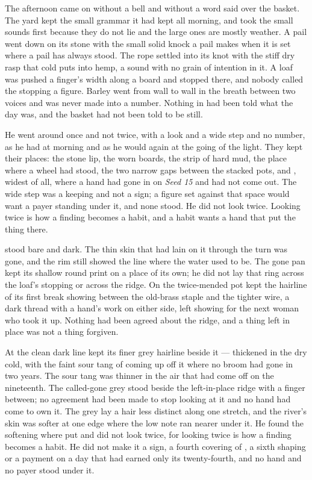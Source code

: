 The afternoon came on without a bell and without a word said over the basket. The yard kept the small grammar it had kept all morning, and  took the small sounds first because they do not lie and the large ones are mostly weather. A pail went down on its stone with the small solid knock a pail makes when it is set where a pail has always stood. The rope settled into its knot with the stiff dry rasp that cold puts into hemp, a sound with no grain of intention in it. A loaf was pushed a finger's width along a board and stopped there, and nobody called the stopping a figure. Barley went from wall to wall in the breath between two voices and was never made into a number. Nothing in  had been told what the day was, and the basket had not been told to be still.

He went around  once and not twice, with a look and a wide step and no number, as he had at morning and as he would again at the going of the light. They kept their places: the stone lip, the worn boards, the strip of hard mud, the place where a wheel had stood, the two narrow gaps between the stacked pots, and , widest of all, where a hand had gone in on \emph{Seed 15} and had not come out. The wide step was a keeping and not a sign; a figure set against that space would want a payer standing under it, and none stood. He did not look twice. Looking twice is how a finding becomes a habit, and a habit wants a hand that put the thing there.

 stood bare and dark. The thin skin that had lain on it through the turn was gone, and the rim still showed the line where the water used to be. The gone pan kept its shallow round print on a place of its own; he did not lay that ring across the loaf's stopping or across the ridge. On  the twice-mended pot kept the hairline of its first break showing between the old-brass staple and the tighter wire, a dark thread with a hand's work on either side, left showing for the next woman who took it up. Nothing had been agreed about the ridge, and a thing left in place was not a thing forgiven.

At  the clean dark line kept its finer grey hairline beside it ---  thickened in the dry cold, with the faint sour tang of  coming up off it where no broom had gone in two years. The sour tang was thinner in the air that had come off  on the nineteenth. The called-gone grey stood beside the left-in-place ridge with a finger between; no agreement had been made to stop looking at it and no hand had come to own it. The grey lay a hair less distinct along one stretch, and the river's skin was softer at one edge where the low note ran nearer under it. He found the softening where put and did not look twice, for looking twice is how a finding becomes a habit. He did not make it a sign, a fourth covering of , a sixth shaping or a payment on a day that had earned only its twenty-fourth, and no hand and no payer stood under it.

